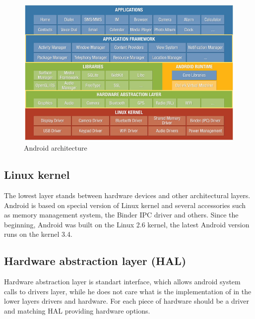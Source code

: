 \begin{figure}[h!]
    \centering
    \includegraphics[scale=0.5]{fig/android_architecture.jpg}
    \caption{Android architecture \cite{AndroidArch}}
    \label{androidArchitecture}
\end{figure}

\subsection{Linux kernel} %
The lowest layer stands between hardware devices and other architectural layers. Android is based on special version of Linux kernel and several accessories such as memory management system, the Binder IPC driver and others. Since the beginning, Android was built on the Linux 2.6 kernel, the latest Android version runs on the kernel 3.4.

\subsection{Hardware abstraction layer (HAL)} %
Hardware abstraction layer is standart interface, which allows android system calls to drivers layer, while he does not care what is the implementation of in the lower layers drivers and hardware. For each piece of hardware should be a driver and matching HAL providing hardware options.


